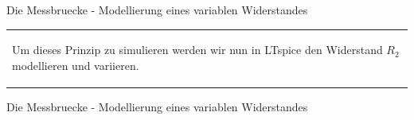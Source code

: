 \begin{frame}[t]{Die Messbruecke - Modellierung eines variablen Widerstandes}
\begin{spacing}{0.9}
\begin{tiny}
\begin{table}[h!]
\begin{tabular}{p{10cm}}
\begin{minipage}{\textwidth}
\begin{figure}
            \end{figure}
            Um dieses Prinzip zu simulieren werden wir nun in LTspice den Widerstand $R_2$ modellieren und variieren.
          \end{minipage}
          \\
        \end{tabular}

      \end{table}

    \end{tiny} \end{spacing}

\end{frame}

\begin{frame}[t]{Die Messbruecke - Modellierung eines variablen Widerstandes}


\end{frame}
